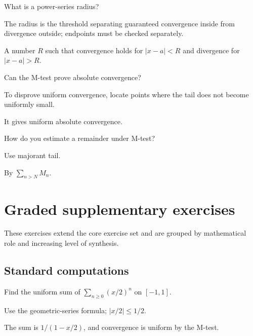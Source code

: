 \begin{exercise}\label{exr:ii13-06}
What is a power-series radius?
\end{exercise}
\begin{hint}
The radius is the threshold separating guaranteed convergence inside from divergence outside; endpoints must be checked separately.
\end{hint}
\begin{solution}
A number $R$ such that convergence holds for $|x-a|<R$ and divergence for $|x-a|>R$.
\end{solution}

\begin{exercise}\label{exr:ii13-07}
Can the M-test prove absolute convergence?
\end{exercise}
\begin{hint}
To disprove uniform convergence, locate points where the tail does not become uniformly small.
\end{hint}
\begin{solution}
It gives uniform absolute convergence.
\end{solution}

\begin{exercise}\label{exr:ii13-08}
How do you estimate a remainder under M-test?
\end{exercise}
\begin{hint}
Use majorant tail.
\end{hint}
\begin{solution}
By $\sum_{n>N}M_n$.
\end{solution}


\section{Graded supplementary exercises}
These exercises extend the core exercise set and are grouped by mathematical role and increasing level of synthesis.

\subsection*{Standard computations}

\begin{exercise}\label{exr:ii13-expand-01}
Find the uniform sum of \(\sum_{n\ge0}(x/2)^n\) on \([-1,1]\).
\end{exercise}
\begin{hint}
Use the geometric-series formula; \(|x/2|\le1/2\).
\end{hint}
\begin{solution}
The sum is \(1/(1-x/2)\), and convergence is uniform by the M-test.
\end{solution}

